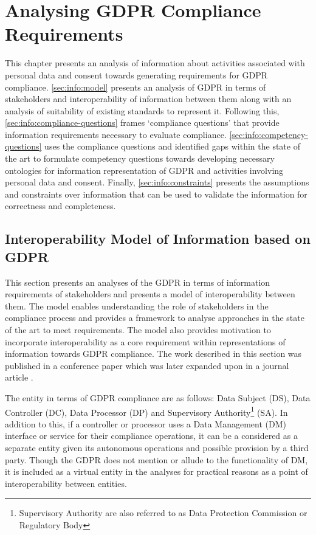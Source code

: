 \chapter{Analysing GDPR Compliance Requirements}
\label{chapter:information}

This chapter presents an analysis of information about activities associated with personal data and consent towards generating requirements for GDPR compliance. \autoref{sec:info:model} presents an analysis of GDPR in terms of stakeholders and interoperability of information between them along with an analysis of suitability of existing standards to represent it. Following this, \autoref{sec:info:compliance-questions} frames `compliance questions' that provide information requirements necessary to evaluate compliance. \autoref{sec:info:competency-questions} uses the compliance questions and identified gaps within the state of the art to formulate competency questions towards developing necessary ontologies for information representation of GDPR and activities involving personal data and consent. Finally, \autoref{sec:info:constraints} presents the assumptions and constraints over information that can be used to validate the information for correctness and completeness.

\section{Interoperability Model of Information based on GDPR}\label{sec:info:model}

This section presents an analyses of the GDPR in terms of information requirements of stakeholders and presents a model of interoperability between them. The model enables understanding the role of stakeholders in the compliance process and provides a framework to analyse approaches in the state of the art to meet requirements. The model also provides motivation to incorporate interoperability as a core requirement within representations of information towards GDPR compliance.
The work described in this section was published in a conference paper
\cite{pandit_gdpr_2018} which was later expanded upon in a journal article \cite{pandit_exploration_2018}. %

The entity in terms of GDPR compliance are as follows: Data Subject (DS), Data Controller (DC), Data Processor (DP) and Supervisory Authority\footnote{Supervisory Authority are also referred to as Data Protection Commission or Regulatory Body} (SA). In addition to this, if a controller or processor uses a Data Management (DM) interface or service for their compliance operations, it can be a considered as a separate entity given its autonomous operations and possible provision by a third party. Though the GDPR does not mention or allude to the functionality of DM, it is included as a virtual entity in the analyses for practical reasons as a point of interoperability between entities.

